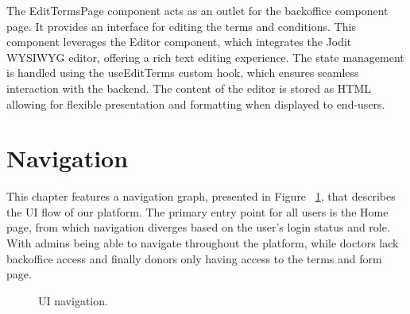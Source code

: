 The EditTermsPage component acts as an outlet for the backoffice component page. It provides an interface for editing the terms and conditions. This component leverages the Editor component, which integrates the Jodit WYSIWYG editor, offering a rich text editing experience. The state management is handled using the useEditTerms custom hook, which ensures seamless interaction with the backend.
The content of the editor is stored as HTML allowing for flexible presentation and formatting when displayed to end-users.


\newpage

\section{Navigation}

This chapter features a navigation graph, presented in Figure ~\ref{fig:userNavigation}, that describes the UI flow of our platform.
The primary entry point for all users is the Home page, from which navigation diverges based on the user's login status and role.
With admins being able to navigate throughout the platform, while doctors lack backoffice access and finally donors only having access to the terms and form page.

\begin{figure}[H]
	\begin{center}
	\end{center}
	\caption{UI navigation.}\label{fig:userNavigation}
\end{figure}










